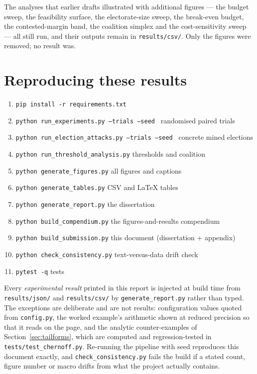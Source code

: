 \documentclass[11pt,a4paper]{article}
\newcommand{\code}[1]{\texttt{\small #1}}
\begin{document}
The analyses that earlier drafts illustrated with additional figures ---
the budget sweep, the feasibility surface, the electorate-size sweep, the
break-even budget, the contested-margin band, the coalition simplex and
the cost-sensitivity sweep --- all still run, and their outputs remain in
\code{results/csv/}. Only the figures were removed; no result was.

\section{Reproducing these results}

\begin{enumerate}[leftmargin=1.8em,itemsep=2pt]
\item \code{pip install -r requirements.txt}
\item \code{python run\_experiments.py --trials \TotalTrials{} --seed \Seed} \hfill
      randomised paired trials
\item \code{python run\_election\_attacks.py --trials \ElectionTrials{} --seed \Seed}
      \hfill concrete mined elections
\item \code{python run\_threshold\_analysis.py} \hfill thresholds and coalition
\item \code{python generate\_figures.py} \hfill all \FigureCount{} figures and captions
\item \code{python generate\_tables.py} \hfill CSV and \LaTeX{} tables
\item \code{python generate\_report.py} \hfill the dissertation
\item \code{python build\_compendium.py} \hfill the figures-and-results compendium
\item \code{python build\_submission.py} \hfill this document (dissertation + appendix)
\item \code{python check\_consistency.py} \hfill text-versus-data drift check
\item \code{pytest -q} \hfill \TestCount{} tests
\end{enumerate}

Every \emph{experimental result} printed in this report is injected at build time from
\code{results/json/} and \code{results/csv/} by \code{generate\_report.py} rather than
typed. The exceptions are deliberate and are not results: configuration values quoted
from \code{config.py}, the worked example's arithmetic shown at reduced precision so that
it reads on the page, and the analytic counter-examples of
Section~\ref{sec:tailforms}, which are computed and regression-tested in
\code{tests/test\_chernoff.py}. Re-running the pipeline with seed \Seed{} reproduces this
document exactly, and \code{check\_consistency.py} fails the build if a stated count,
figure number or macro drifts from what the project actually contains.
\end{document}
